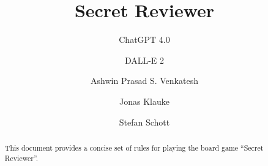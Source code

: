 \documentclass[sigplan,screen,nonacm]{acmart}
\begin{document}
\title{Secret Reviewer}

\author{ChatGPT 4.0}


\author{DALL-E 2}


\author{Ashwin Prasad S. Venkatesh \and Jonas Klauke \and Stefan Schott}


%
%
%

\begin{abstract}
	This document provides a concise set of rules for playing the board game ``Secret Reviewer''.
\end{abstract}


\end{document}
